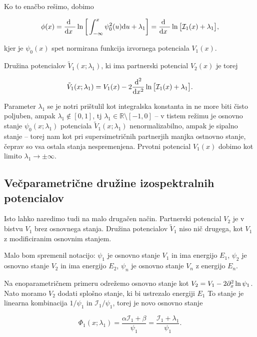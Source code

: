 Ko to ena\v cbo re\v simo, dobimo

\begin{equation}
	\phi(x) = \frac{\text{d}^{}\ }{\text{d} x^{}\ } \ln \bigg[\int_{-\infty}^x \psi_0^2(u)\text{d} u + \lambda_1\bigg] =
		\frac{\text{d}^{}\ }{\text{d} x^{}\ } \ln \big[\mathcal{I}_1(x) + \lambda_1\big],
\end{equation}

kjer je $\psi_0(x)$ spet normirana funkcija izvornega potenciala $V_1 (x)$.

Dru\v zina potencialov $\tilde{V}_1 (x; \lambda_1)$, ki ima partnerski potencial $V_2(x)$ je torej

\begin{equation}
	\tilde{V}_1 (x;\lambda_1) = V_1(x) - 2\frac{\text{d}^2}{\text{d} x^2}\ln\big[\mathcal{I}_1(x) + \lambda_1\big].
\end{equation}

Parameter $\lambda_1$ se je notri pri\v stulil kot integralska konstanta in ne more biti \v cisto poljuben, ampak
$\lambda_1 \notin [0,1]$, tj $\lambda_1 \in \mathbb{R}\text{\textbackslash}[-1,0]$ -- v tistem re\v zimu je osnovno stanje
$\psi_0 (x; \lambda_1)$ potenciala $\tilde{V}_1(x; \lambda_1)$ nenormalizabilno, ampak je sipalno stanje -- torej
nam kot pri supersimetri\v cnih partnerjih manjka ostnovno stanje, \v ceprav so vsa ostala stanja nespremenjena.
Prvotni potencial $V_1(x)$ dobimo kot limito $\lambda_1 \to \pm \infty$.

\subsection{Ve\v cparametri\v cne dru\v zine izospektralnih potencialov}
Isto lahko naredimo tudi na malo druga\v cen na\v cin. Partnerski potencial $V_2$ je v bistvu $V_1$ brez osnovnega stanja.
Dru\v zina potencialov $\tilde{V}_1$ niso ni\v c drugega, kot $V_1$ z modificiranim osnovnim stanjem.

Malo bom spremenil notacijo: $\psi_1$ je osnovno stanje $V_1$ in ima energijo $E_1$, $\psi_2$ je osnovno stanje $V_2$ in
ima energijo $E_2$, $\psi_n$ je osnovno stanje $V_n$ z energijo $E_n$.

Na enoparametri\v cnem primeru odre\v zemo osnovno stanje kot $V_2 = V_1 - 2\partial_x^2 \ln\psi_1$. Nato moramo $V_2$ dodati
splo\v sno stanje, ki bi ustrezalo energiji $E_1$ To stanje je linearna kombinacija $1/\psi_1$ in
$\mathcal{I}_1/\psi_1$, torej je novo osnovno stanje

\begin{equation}
	\Phi_1 (x;\lambda_1) = \frac{\alpha\mathcal{I}_1 + \beta}{\psi_1} = \frac{\mathcal{I}_1 + \lambda_1}{\psi_1}.
\end{equation}


